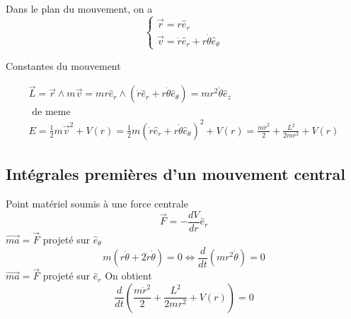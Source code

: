 \documentclass[../main.tex]{subfiles}
\begin{document}
	Dans le plan du mouvement, on a 
	\[ 
	\begin{cases}
	\vec{r} = r \hat{e}_r\\
	\vec{v} = \dot{r} \hat{e}_r + r \dot{\theta}\hat{e}_\theta
	\end{cases}
	\]
	
	Constantes du mouvement

	\begin{align*}
		\vec{L} = \vec{r} \land m \vec{v} = mr \hat{e}_r \land ( \dot{r} \hat{e}_r + r \dot{\theta} \hat{e}_\theta) = m r^{2} \dot{\theta} \hat{e}_z\\
		\text{ de meme } \\
		E= \frac{1}{2}m \vec{v}^{2} + V( r)  = \frac{1}{2}m ( \dot{r} \hat{e}_r + r \dot{\theta} \hat{e}_\theta) ^{2} + V( r)  = \frac{m \dot{r}^{2}}{2} + \frac{L^{2}}{2 m r^{2}}+ V( r) 	
	\end{align*}


\subsection{Intégrales premières d'un mouvement central}
Point matériel soumis à une force centrale
\[ 
\vec{F} = - \frac{dV}{dr}\hat{e}_r
\]
$\vec{ma} = \vec{F}$ projeté sur $\hat{e}_\theta$ 
\[ 
	m( r \ddot{\theta} + 2 \dot{r} \dot{\theta}) = 0 \iff \frac{d}{dt}( mr^{2}\dot{\theta}) = 0
\]
$\vec{ma} = \vec{F}$ projeté sur $\hat{e}_r$ 
On obtient
\[ 
	\frac{d}{dt} \left( \frac{m \dot{r}^{2}}{2} + \frac{L^{2}}{2 m r^{2}}+ V( r) \right) =0
\]


	
\end{document}
